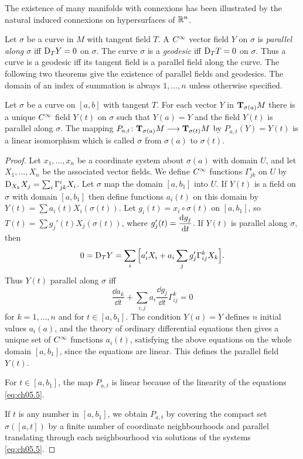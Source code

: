 \documentclass[../main]{subfiles}
\begin{document}
The existence of many manifolds with connexions has been illustrated by the natural induced connexions on hypersurfaces of $\bbR^n$.

Let $\sigma$ be a curve in $M$ with tangent field $T$. A $\CInfty$ vector field $Y$ on $\sigma$ is \emph{parallel along $\sigma$} iff $\connection_T Y = 0$ on $\sigma$. The curve $\sigma$ is a \emph{geodesic} iff $\connection_T T = 0$ on $\sigma$. Thus a curve is a geodesic iff its tangent field is a parallel field along the curve. The following two theorems give the existence of parallel fields and geodesics. The domain of an index of summation is always $1,\dots,n$ unless otherwise specified.



\begin{theorem} \label{thm:ch5.1.1} %
Let $\sigma$ be a curve on $[a,b]$ with tangent $T$. For each vector $Y$ in $\tangentspace{M}{\sigma(a)}$ there is a unique $\CInfty$ field $Y(t)$ on $\sigma$ such that $Y(a) = Y$ and the field $Y(t)$ is parallel along $\sigma$. The mapping $P_{a,t} \colon \tangentspace{M}{\sigma(a)} \longrightarrow \tangentspace{M}{\sigma(t)}$ by $P_{a,t}(Y) = Y(t)$ is a linear isomorphism which is called  $\sigma$ from $\sigma(a)$ to $\sigma(t)$.
\end{theorem}

\begin{proof}
Let $x_1,\dots,x_n$ be a coordinate system about $\sigma(a)$ with domain $U$, and let $X_1,\dots,X_n$ be the associated vector fields. We define $\CInfty$ functions $\Gamma_{jk}^i$ on $U$ by $\connection_{X_k}X_j = \sum_{i} \Gamma_{jk}^i X_i$. Let $\sigma$ map the domain $[a,b_1]$ into $U$. If $Y(t)$ is a field on $\sigma$ with domain $[a,b_1]$ then define functions $a_i(t)$ on this domain by $Y(t) = \sum a_i(t) X_i(\sigma(t))$. Let $g_i(t) = x_i \circ \sigma(t)$ on $[a,b_1]$, so $T(t) = \sum g_j'(t) X_j(\sigma(t))$, where $g_j'(t) = \dv{g_j}{t}$. If $Y(t)$ is parallel along $\sigma$, then
\[0 = \connection_T Y = \sum_i\Big[a_i'X_i + a_i \sum_j g_j'\Gamma_{ij}^k X_k\Big].\]
Thus $Y(t)$ parallel along $\sigma$ iff
\begin{equation} \label{eq:ch05.5}
\tag{5}
\frac{\dd{a_k}}{\dd{t}} + \sum_{i,j} a_i \frac{\dd{g_j}}{\dd{t}} \Gamma_{ij}^k = 0
\end{equation}
for $k=1,\dots,n$ and for $t \in [a,b_1]$. The condition $Y(a) = Y$ defines $n$ initial values $a_i(a)$, and the theory of ordinary differential equations then gives a unique set of $\CInfty$ functions $a_i(t)$, satisfying the above equations on the whole domain $[a,b_1]$, since the equations are linear. This defines the parallel field $Y(t)$.

For $t \in [a,b_1]$, the map $P_{a,t}$ is linear because of the linearity of the equations \ref{eq:ch05.5}.

If $t$ is any number in $[a,b_1]$, we obtain $P_{a,t}$ by covering the compact set $\sigma([a,t])$ by a finite number of coordinate neighbourhoods and parallel translating through each neighbourhood via solutions of the systems \ref{eq:ch05.5}.
\end{proof}
\end{document}
